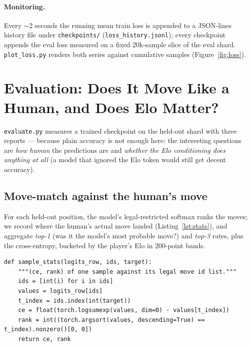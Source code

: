\documentclass[10pt,a4paper]{article}
\newcommand{\code}[1]{\texttt{#1}}
\begin{document}
\paragraph{Monitoring.} Every $\sim$2 seconds the running mean train loss
is appended to a JSON-lines history file under \code{checkpoints/}
(\verb|loss_history.jsonl|); every checkpoint appends the eval loss
measured on a fixed 20k-sample slice of the eval shard.
\verb|plot_loss.py| renders both series against cumulative samples
(Figure~\ref{fig:loss}).

\section{Evaluation: Does It Move Like a Human, and Does Elo Matter?}\label{sec:eval}

\code{evaluate.py} measures a trained checkpoint on the held-out shard
with three reports --- because plain accuracy is not enough here: the
interesting questions are \emph{how human} the predictions are and
\emph{whether the Elo conditioning does anything at all} (a model that
ignored the Elo token would still get decent accuracy).

\subsection{Move-match against the human's move}

For each held-out position, the model's legal-restricted softmax ranks
the moves; we record where the human's actual move landed
(Listing~\ref{lst:stats}), and aggregate \emph{top-1} (was it the
model's most probable move?) and \emph{top-3} rates, plus the
cross-entropy, bucketed by the player's Elo in 200-point bands.

\begin{lstlisting}[style=code, caption={Per-sample statistics
(\code{evaluate.py}). \code{ce} is Eq.~\eqref{eq:maskedce} for one
sample; \code{rank} is the position of the human's move among the
model's sorted legal moves (0 = top-1).}, label={lst:stats}]
def sample_stats(logits_row, ids, target):
    """(ce, rank) of one sample against its legal move id list."""
    ids = [int(i) for i in ids]
    values = logits_row[ids]
    t_index = ids.index(int(target))
    ce = float(torch.logsumexp(values, dim=0) - values[t_index])
    rank = int((torch.argsort(values, descending=True) == t_index).nonzero()[0, 0])
    return ce, rank
\end{lstlisting}
\end{document}

